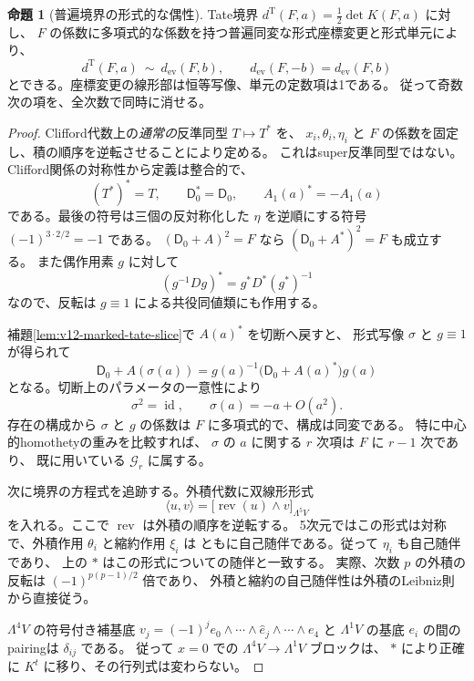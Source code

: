\documentclass[a4paper,11pt]{ltjsarticle}
\theoremstyle{definition}
\newtheorem{theorem}{命題}[section]
\begin{document}
\begin{theorem}[普遍境界の形式的な偶性]
\label{thm:v12-all-order-parity}
Tate境界 $d^{\mathrm T}(F,a)=\tfrac12\det K(F,a)$ に対し、
$F$ の係数に多項式的な係数を持つ普遍同変な形式座標変更と形式単元により、
\[
 d^{\mathrm T}(F,a)\ \sim\ d_{\mathrm{ev}}(F,b),\qquad
 d_{\mathrm{ev}}(F,-b)=d_{\mathrm{ev}}(F,b)
\]
とできる。座標変更の線形部は恒等写像、単元の定数項は1である。
従って奇数次の項を、全次数で同時に消せる。
\end{theorem}
\begin{proof}
Clifford代数上の\emph{通常の}反準同型 $T\mapsto T^*$ を、
$x_i,\theta_i,\eta_i$ と $F$ の係数を固定し、積の順序を逆転させることにより定める。
これはsuper反準同型ではない。
Clifford関係の対称性から定義は整合的で、
\[
 (T^*)^*=T,\qquad \mathsf D_0^*=\mathsf D_0,\qquad
 A_1(a)^*=-A_1(a)
\]
である。最後の符号は三個の反対称化した $\eta$ を逆順にする符号
$(-1)^{3\cdot2/2}=-1$ である。
$(\mathsf D_0+A)^2=F$ なら $(\mathsf D_0+A^*)^2=F$ も成立する。
また偶作用素 $g$ に対して
\[
 (g^{-1}Dg)^*=g^*D^*(g^*)^{-1}
\]
なので、反転は $g\equiv1$ による共役同値類にも作用する。

補題\ref{lem:v12-marked-tate-slice}で $A(a)^*$ を切断へ戻すと、
形式写像 $\sigma$ と $g\equiv1$ が得られて
\begin{equation}\label{eq:v12-reversion-regauging}
 \mathsf D_0+A(\sigma(a))
 =g(a)^{-1}\bigl(\mathsf D_0+A(a)^*\bigr)g(a)
\end{equation}
となる。切断上のパラメータの一意性により
\[
 \sigma^2=\operatorname{id},\qquad \sigma(a)=-a+O(a^2).
\]
存在の構成から $\sigma$ と $g$ の係数は $F$ に多項式的で、構成は同変である。
特に中心的homothetyの重みを比較すれば、
$\sigma$ の $a$ に関する $r$ 次項は $F$ に $r-1$ 次であり、
既に用いている $\mathcal G_r$ に属する。

次に境界の方程式を追跡する。外積代数に双線形形式
\[
 \langle u,v\rangle
 =\bigl[\operatorname{rev}(u)\wedge v\bigr]_{\Lambda^5V}
\]
を入れる。ここで $\operatorname{rev}$ は外積の順序を逆転する。
5次元ではこの形式は対称で、外積作用 $\theta_i$ と縮約作用 $\xi_i$ は
ともに自己随伴である。従って $\eta_i$ も自己随伴であり、
上の $*$ はこの形式についての随伴と一致する。
実際、次数 $p$ の外積の反転は $(-1)^{p(p-1)/2}$ 倍であり、
外積と縮約の自己随伴性は外積のLeibniz則から直接従う。

$\Lambda^4V$ の符号付き補基底
$v_j=(-1)^j e_0\wedge\cdots\wedge\widehat e_j\wedge\cdots\wedge e_4$
と $\Lambda^1V$ の基底 $e_i$ の間のpairingは $\delta_{ij}$ である。
従って $x=0$ での $\Lambda^4V\to\Lambda^1V$ ブロックは、
$*$ により正確に $K^t$ に移り、その行列式は変わらない。


\end{proof}
\end{document}
